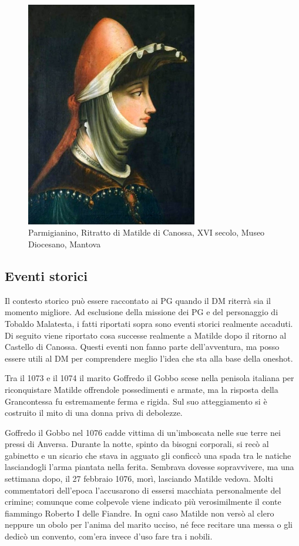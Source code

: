 \documentclass[letterpaper,twocolumn,openany,nodeprecatedcode]{dndbook}
\begin{document}
\begin{figure}
\centering
\includegraphics[width=7.5cm]{img/matilde.png}
    \caption{\textsf{Parmigianino, Ritratto di Matilde di Canossa, XVI secolo, Museo Diocesano, Mantova}}
    \label{fig:matilde}
\end{figure}

\subsection{Eventi storici}
Il contesto storico può essere raccontato ai PG quando il DM riterrà sia il momento migliore. Ad esclusione della missione dei PG e del personaggio di Tobaldo Malatesta, i fatti riportati sopra sono eventi storici realmente accaduti. Di seguito viene riportato cosa successe realmente a Matilde dopo il ritorno al Castello di Canossa. Questi eventi non fanno parte dell'avventura, ma posso essere utili al DM per comprendere meglio l'idea che sta alla base della oneshot.

Tra il 1073 e il 1074 il marito Goffredo il Gobbo scese nella penisola italiana per riconquistare Matilde offrendole possedimenti e armate, ma la risposta della Grancontessa fu estremamente ferma e rigida. Sul suo atteggiamento si è costruito il mito di una donna priva di debolezze.

Goffredo il Gobbo nel 1076 cadde vittima di un'imboscata nelle sue terre nei pressi di Anversa. Durante la notte, spinto da bisogni corporali, si recò al gabinetto e un sicario che stava in agguato gli conficcò una spada tra le natiche lasciandogli l'arma piantata nella ferita. Sembrava dovesse sopravvivere, ma una settimana dopo, il 27 febbraio 1076, morì, lasciando Matilde vedova. Molti commentatori dell'epoca l'accusarono di essersi macchiata personalmente del crimine; comunque come colpevole viene indicato più verosimilmente il conte fiammingo Roberto I delle Fiandre. In ogni caso Matilde non versò al clero neppure un obolo per l'anima del marito ucciso, né fece recitare una messa o gli dedicò un convento, com'era invece d'uso fare tra i nobili. 
\end{document}
